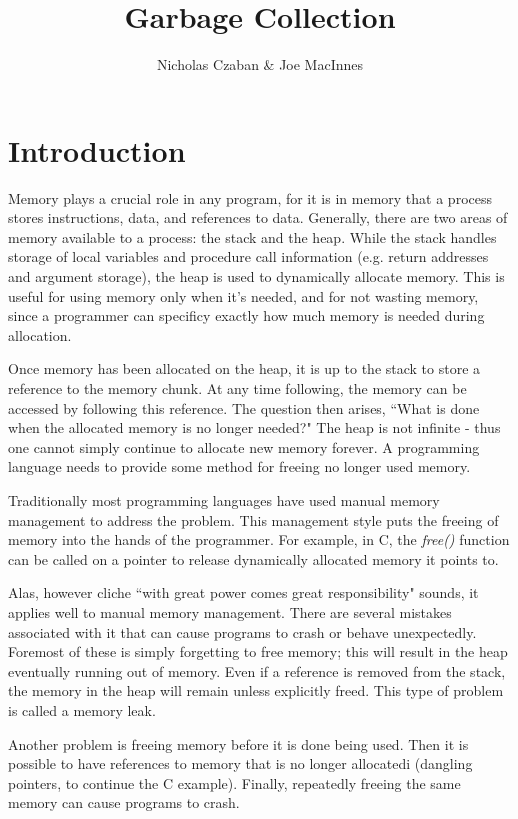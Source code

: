 \documentclass[12pt]{article}
\begin{document}
\title{Garbage Collection}
\author{Nicholas Czaban \& Joe MacInnes}
\maketitle
\section{Introduction}
Memory plays a crucial role in any program, for it is in memory that a process stores instructions, data, and references to data. Generally, there are two areas of memory available to a process: the stack and the heap. While the stack handles storage of local variables and procedure call information (e.g. return addresses and argument storage), the heap is used to dynamically allocate memory. This is useful for using memory only when it's needed, and for not wasting memory, since a programmer can specificy exactly how much memory is needed during allocation.  

Once memory has been allocated on the heap, it is up to the stack to store a reference to the memory chunk. At any time following, the memory can be accessed by following this reference. The question then arises, ``What is done when the allocated memory is no longer needed?" The heap is not infinite - thus one cannot simply continue to allocate new memory forever. A programming language needs to provide some method for freeing no longer used memory.

Traditionally most programming languages have used manual memory management to address the problem. This management style puts the freeing of memory into the hands of the programmer. For example, in C, the \textit{free()} function can be called on a pointer to release dynamically allocated memory it points to.

Alas, however cliche ``with great power comes great responsibility" sounds, it applies well to manual memory management. There are several mistakes associated with it that can cause programs to crash or behave unexpectedly. Foremost of these is simply forgetting to free memory; this will result in the heap eventually running out of memory. Even if a reference is removed from the stack, the memory in the heap will remain unless explicitly freed. This type of problem is called a memory leak.

Another problem is freeing memory before it is done being used. Then it is possible to have references to memory that is no longer allocatedi (dangling pointers, to continue the C example). Finally, repeatedly freeing the same memory can cause programs to crash. \cite{os_textbook}
\end{document}

